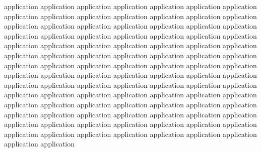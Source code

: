 \documentclass[platex,ja=standard,12pt,a4paper,twoside,onecolumn,fleqn,dvipdfmx,english]{bxjsbook}
\begin{document}
application application application application application application application application application application application application application application application application application application application application application application application application application application application application application application application application application application application application application application application application application application application application application application application application application application application application application application application application application application application application application application application application application application application application application application application application application application application application application application application application application application application application application application application application application application application application application application application application application application application application
\end{document}
